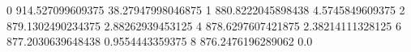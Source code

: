 0 914.527099609375 38.27947998046875
1 880.8222045898438 4.5745849609375
2 879.1302490234375 2.88262939453125
4 878.6297607421875 2.38214111328125
6 877.2030639648438 0.9554443359375
8 876.2476196289062 0.0
